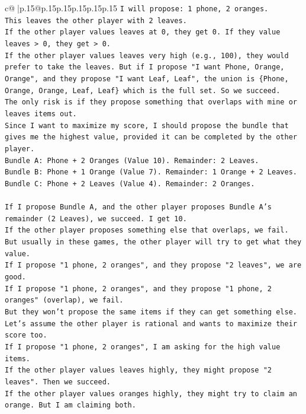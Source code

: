 \documentclass{article}
\begin{document}
{\begin{supertabular}{c@{$\;$}|p{.15\linewidth}@{}p{.15\linewidth}p{.15\linewidth}p{.15\linewidth}p{.15\linewidth}p{.15\linewidth}}
{{{\texttt{I will propose: 1 phone, 2 oranges.} \\
\texttt{This leaves the other player with 2 leaves.} \\
\texttt{If the other player values leaves at 0, they get 0. If they value leaves > 0, they get > 0.} \\
\texttt{If the other player values leaves very high (e.g., 100), they would prefer to take the leaves. But if I propose "I want Phone, Orange, Orange", and they propose "I want Leaf, Leaf", the union is \{Phone, Orange, Orange, Leaf, Leaf\} which is the full set. So we succeed.} \\
\texttt{The only risk is if they propose something that overlaps with mine or leaves items out.} \\
\texttt{Since I want to maximize my score, I should propose the bundle that gives me the highest value, provided it can be completed by the other player.} \\
\texttt{Bundle A: Phone + 2 Oranges (Value 10). Remainder: 2 Leaves.} \\
\texttt{Bundle B: Phone + 1 Orange (Value 7). Remainder: 1 Orange + 2 Leaves.} \\
\texttt{Bundle C: Phone + 2 Leaves (Value 4). Remainder: 2 Oranges.} \\
\\ 
\texttt{If I propose Bundle A, and the other player proposes Bundle A's remainder (2 Leaves), we succeed. I get 10.} \\
\texttt{If the other player proposes something else that overlaps, we fail.} \\
\texttt{But usually in these games, the other player will try to get what they value.} \\
\texttt{If I propose "1 phone, 2 oranges", and they propose "2 leaves", we are good.} \\
\texttt{If I propose "1 phone, 2 oranges", and they propose "1 phone, 2 oranges" (overlap), we fail.} \\
\texttt{But they won't propose the same items if they can get something else.} \\
\texttt{Let's assume the other player is rational and wants to maximize their score too.} \\
\texttt{If I propose "1 phone, 2 oranges", I am asking for the high value items.} \\
\texttt{If the other player values leaves highly, they might propose "2 leaves". Then we succeed.} \\
\texttt{If the other player values oranges highly, they might try to claim an orange. But I am claiming both.} \\
}}}
\end{supertabular}}
\end{document}
